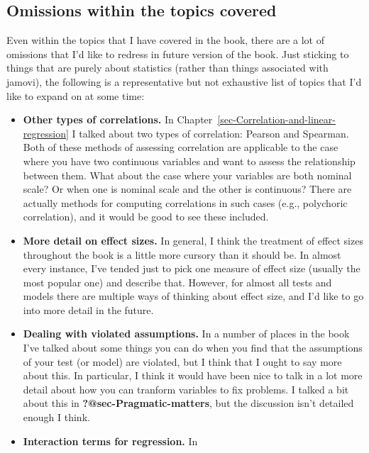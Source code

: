 \documentclass[
  a4paper,
]{book}
\begin{document}
\hypertarget{omissions-within-the-topics-covered}{%
\subsection*{Omissions within the topics
covered}\label{omissions-within-the-topics-covered}}

Even within the topics that I have covered in the book, there are a lot
of omissions that I'd like to redress in future version of the book.
Just sticking to things that are purely about statistics (rather than
things associated with jamovi), the following is a representative but
not exhaustive list of topics that I'd like to expand on at some time:

\begin{itemize}
\item
  \textbf{Other types of correlations.} In
  Chapter~\ref{sec-Correlation-and-linear-regression} I talked about two
  types of correlation: Pearson and Spearman. Both of these methods of
  assessing correlation are applicable to the case where you have two
  continuous variables and want to assess the relationship between them.
  What about the case where your variables are both nominal scale? Or
  when one is nominal scale and the other is continuous? There are
  actually methods for computing correlations in such cases (e.g.,
  polychoric correlation), and it would be good to see these included.
\item
  \textbf{More detail on effect sizes.} In general, I think the
  treatment of effect sizes throughout the book is a little more cursory
  than it should be. In almost every instance, I've tended just to pick
  one measure of effect size (usually the most popular one) and describe
  that. However, for almost all tests and models there are multiple ways
  of thinking about effect size, and I'd like to go into more detail in
  the future.
\item
  \textbf{Dealing with violated assumptions.} In a number of places in
  the book I've talked about some things you can do when you find that
  the assumptions of your test (or model) are violated, but I think that
  I ought to say more about this. In particular, I think it would have
  been nice to talk in a lot more detail about how you can tranform
  variables to fix problems. I talked a bit about this in
  \textbf{?@sec-Pragmatic-matters}, but the discussion isn't detailed
  enough I think.
\item
  \textbf{Interaction terms for regression.} In

\end{itemize}
\end{document}
